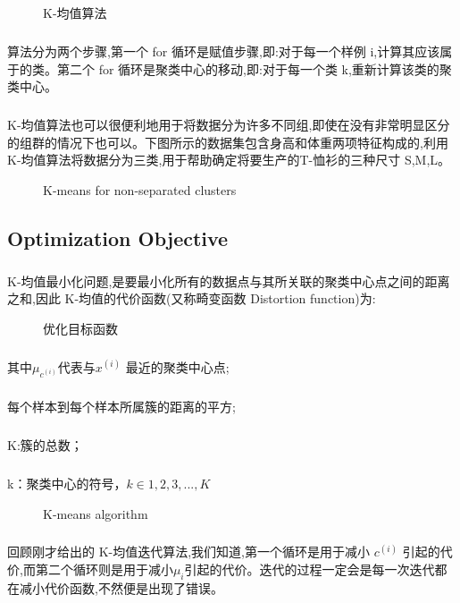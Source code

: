 \documentclass{article}
\begin{document}
\begin{CJK}{UTF8}{gbsn}
\begin{figure}[H]
\label{fig:810}
\caption{K-均值算法}
\end{figure}
\subparagraph{}
算法分为两个步骤,第一个 for 循环是赋值步骤,即:对于每一个样例 i,计算其应该属于的类。第二个 for 循环是聚类中心的移动,即:对于每一个类 k,重新计算该类的聚类中心。
\subparagraph{}
K-均值算法也可以很便利地用于将数据分为许多不同组,即使在没有非常明显区分的组群的情况下也可以。下图所示的数据集包含身高和体重两项特征构成的,利用 K-均值算法将数据分为三类,用于帮助确定将要生产的T-恤衫的三种尺寸 S,M,L。
\begin{figure}[H]
\label{fig:812}
\caption{K-means for non-separated clusters}
\end{figure}
\begin{figure}[H]
\label{fig:811}
\end{figure}
\subsection{Optimization Objective}
\subparagraph{}
K-均值最小化问题,是要最小化所有的数据点与其所关联的聚类中心点之间的距离之和,因此 K-均值的代价函数(又称畸变函数 Distortion function)为:
\begin{figure}[H]
\label{fig:817}
\caption{优化目标函数}
\end{figure}
\subparagraph{}
其中$\mu_{c^{(i)}}$代表与$x^{(i)}$ 最近的聚类中心点;
\subparagraph{}
每个样本到每个样本所属簇的距离的平方;
\subparagraph{}
K:簇的总数；
\subparagraph{}
k：聚类中心的符号，$k\in{{1,2,3,...,K}}$
\begin{figure}[H]
\label{fig:813}
\caption{K-means algorithm}
\end{figure}
\subparagraph{}
回顾刚才给出的 K-均值迭代算法,我们知道,第一个循环是用于减小 $c^{(i)}$ 引起的代价,而第二个循环则是用于减小$\mu_i$引起的代价。迭代的过程一定会是每一次迭代都在减小代价函数,不然便是出现了错误。
\begin{figure}[H]
\label{fig:814}
\end{figure}
\begin{figure}[H]
\label{fig:815}
\end{figure}

\end{CJK}
\end{document}
